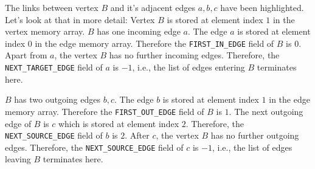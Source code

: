 \documentclass[a4paper]{article}
\begin{document}
\begin{center}
\end{center}
The links between vertex $B$ and it's adjacent edges $a, b, c$ have been highlighted.
Let's look at that in more detail:
Vertex $B$ is stored at element index $1$ in the vertex memory array.
$B$ has one incoming edge $a$.
The edge $a$ is stored at element index $0$ in the edge memory array.
Therefore the \texttt{FIRST\_IN\_EDGE} field of $B$ is $0$.
%
Apart from $a$, the vertex $B$ has no further incoming edges.
Therefore, the \texttt{NEXT\_TARGET\_EDGE} field of $a$ is $-1$, i.e., the list of edges entering $B$ terminates here.

$B$ has two outgoing edges $b, c$.
The edge $b$ is stored at element index $1$ in the edge memory array.
Therefore the \texttt{FIRST\_OUT\_EDGE} field of $B$ is $1$.
%
The next outgoing edge of $B$ is $c$ which is stored at element index $2$.
Therefore, the \texttt{NEXT\_SOURCE\_EDGE} field of $b$ is $2$.
After $c$, the vertex $B$ has no further outgoing edges.
Therefore, the \texttt{NEXT\_SOURCE\_EDGE} field of $c$ is $-1$, i.e., the list of edges leaving $B$ terminates here.
\end{document}
